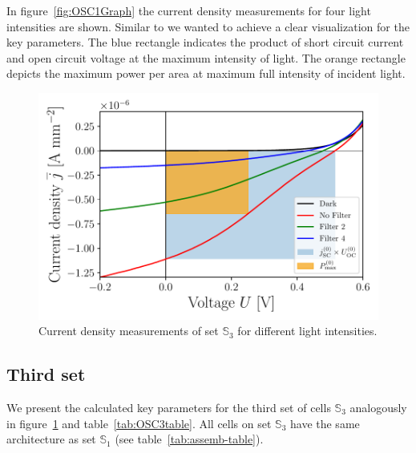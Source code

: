 \documentclass[a4paper,10pt,twocolumn]{article}
\begin{document}
\begin{extract*}
In figure~\ref{fig:OSC1Graph} the current density measurements for four light intensities are shown. Similar to \cite{source1} we wanted to achieve a clear visualization for the key parameters. The blue rectangle indicates the product of short circuit current and open circuit voltage at the maximum intensity of light. The orange rectangle depicts the maximum power per area at maximum full intensity of incident light.
\begin{figure}[h]\centering
	\includegraphics[width=\columnwidth]{../../../IV-Curve-Analysis/OSC2Graph.pdf}
	\caption{Current density measurements of set $\mathbb{S}_3$ for different light intensities.}
	\label{fig:OSC3Graph}
\end{figure}
\subsection{Third set}

We present the calculated key parameters for the third set of cells $\mathbb{S}_3$ analogously in figure~\ref{fig:OSC3Graph} and table~\ref{tab:OSC3table}. All cells on set $\mathbb{S}_3$ have the same architecture as set $\mathbb{S}_1$ (see table~\ref{tab:assemb-table}).


\end{extract*}
\end{document}
